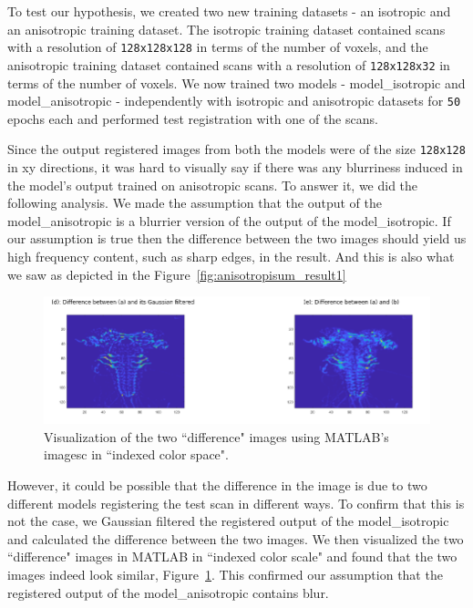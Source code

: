\documentclass{book}
\begin{document}
	To test our hypothesis, we created two new training datasets - an isotropic and an anisotropic training dataset. The isotropic training dataset contained scans with a resolution of \texttt{128x128x128} in terms of the number of voxels, and the anisotropic training dataset contained scans with a resolution of \texttt{128x128x32} in terms of the number of voxels. We now trained two models - model\_isotropic and model\_anisotropic - independently with isotropic and anisotropic datasets for \texttt{50} epochs each and performed test registration with one of the scans.
	
	Since the output registered images from both the models were of the size \texttt{128x128} in xy directions, it was hard to visually say if there was any blurriness induced in the model's output trained on anisotropic scans. To answer it, we did the following analysis. We made the assumption that the output of the model\_anisotropic is a blurrier version of the output of the model\_isotropic. If our assumption is true then the difference between the two images should yield us high frequency content, such as sharp edges, in the result. And this is also what we saw as depicted in the Figure~\ref{fig:anisotropisum_result1}
	
	\begin{figure}[H]
		\centering
		\includegraphics[width=0.7\columnwidth]{resources/discussion/anisotropic_effect/Result_2.png}
		\caption{Visualization of the two ``difference" images using MATLAB's imagesc in ``indexed color space".}
		\label{fig:anisotropisum_result2}
	\end{figure}
	
	However, it could be possible that the difference in the image is due to two different models registering the test scan in different ways. To confirm that this is not the case, we Gaussian filtered the registered output of the model\_isotropic and calculated the difference between the two images. We then visualized the two ``difference" images in MATLAB in ``indexed color scale" and found that the two images indeed look similar, Figure~\ref{fig:anisotropisum_result2}. This confirmed our assumption that the registered output of the model\_anisotropic contains blur.
\end{document}

